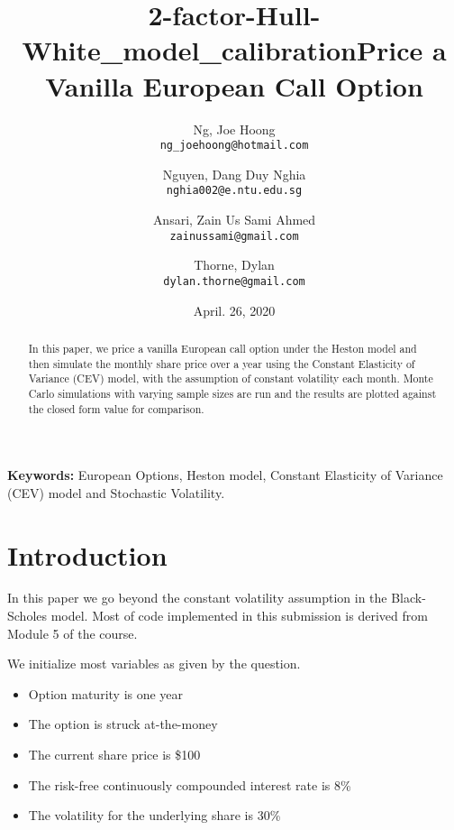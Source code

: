 \documentclass[11pt]{article}
\title{2-factor-Hull-White\_model\_calibration}
\begin{document}
\nocite{*} %

\title{Price a Vanilla European Call Option}

\author{
  Ng, Joe Hoong\\
  \texttt{ng\_joehoong@hotmail.com}
  \and
  Nguyen, Dang Duy Nghia \\
  \texttt{nghia002@e.ntu.edu.sg}
   \and
  Ansari, Zain Us Sami Ahmed \\
  \texttt{zainussami@gmail.com}  
   \and
   Thorne, Dylan \\
  \texttt{dylan.thorne@gmail.com}  
  }

\date{April. 26, 2020} %
\maketitle

\noindent
\textbf{Keywords:} European Options, Heston model,  Constant Elasticity of Variance (CEV) model and Stochastic Volatility.



\begin{abstract}
    In this paper, we price a vanilla European call option under the Heston model and then simulate the monthly share price over a year using the Constant Elasticity of Variance (CEV) model, with the assumption of constant volatility each month. Monte Carlo simulations with varying sample sizes are run and the results are plotted against the closed form value for comparison.
\end{abstract}

\section{Introduction
}

In this paper we go beyond the constant volatility assumption in the Black-Scholes model.  Most of code implemented in this submission is derived from Module 5 \cite{M5} of the course. 

We initialize most variables as given by the question. 

\begin{itemize}
    \item Option maturity is one year
    \item The option is struck at-the-money
    \item The current share price is \$100
    \item The risk-free continuously compounded interest rate is 8\%
    \item The volatility for the underlying share is 30\%
\end{itemize}
\end{document}
